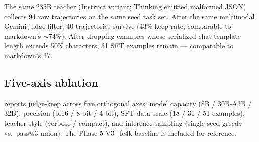 \documentclass[11pt]{article}
\begin{document}
The same 235B teacher (Instruct variant; Thinking emitted malformed JSON) collects 94 raw trajectories on the same seed task set. After the same multimodal Gemini judge filter, 40 trajectories survive (43\% keep rate, comparable to markdown's $\sim$74\%). After dropping examples whose serialized chat-template length exceeds 50K characters, 31 SFT examples remain --- comparable to markdown's 37.

\subsection{Five-axis ablation}

 reports judge-keep across five orthogonal axes: model capacity (8B / 30B-A3B / 32B), precision (bf16 / 8-bit / 4-bit), SFT data scale (18 / 31 / 51 examples), teacher style (verbose / compact), and inference sampling (single seed greedy vs.\ pass@3 union). The Phase 5 V3+fc4k baseline is included for reference.
\end{document}
